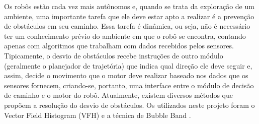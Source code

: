 Os robôs estão cada vez mais autônomos e, quando se trata da
exploração de um ambiente, uma importante tarefa que ele deve estar
apto a realizar é a prevenção de obstáculos em seu caminho. Essa
tarefa é dinâmica, ou seja, não é necessário ter um conhecimento
prévio do ambiente em que o robô se encontra, contando apenas com
algoritmos que trabalham com dados recebidos pelos
sensores. Tipicamente, o desvio de obstáculos recebe instruções de
outro módulo (geralmente o planejador de trajetória) que indica qual direção
ele deve seguir e, assim, decide o movimento que o motor deve realizar
baseado nos dados que os sensores fornecem, criando-se, portanto, uma
interface entre o módulo de decisão de caminho e o motor do robô.
Atualmente, existem diversos métodos que propõem a resolução do
desvio de obstáculos. Os utilizados neste projeto foram o Vector Field
Histogram (VFH) \cite{c1} e a técnica de Bubble Band \cite{c3}.